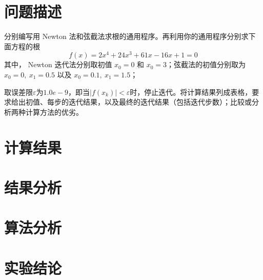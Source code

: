 \documentclass[11pt]{article}
\begin{document}
\maketitle %

\thispagestyle{empty} %

\newpage

\section{问题描述}
分别编写用 Newton 法和弦截法求根的通用程序。再利用你的通用程序分别求下面方程的根
$$
    f(x) = 2x^4 + 24x^3 + 61x - 16x + 1 = 0
$$
其中， Newton 迭代法分别取初值 $x_0 = 0$ 和 $x_0 = 3$；弦截法的初值分别取为 $x_0 = 0,\ x_1 = 0.5$ 以及 $x_0 = 0.1,\ x_1 = 1.5$；

取误差限$\varepsilon$为$1.0e-9$，即当$|f(x_k)| < \varepsilon$时，停止迭代。将计算结果列成表格，要求给出初值、每步的迭代结果，以及最终的迭代结果（包括迭代步数）；比较或分析两种计算方法的优劣。

\section{计算结果}

\section{结果分析}


\section{算法分析}


\section{实验结论}
\end{document}
